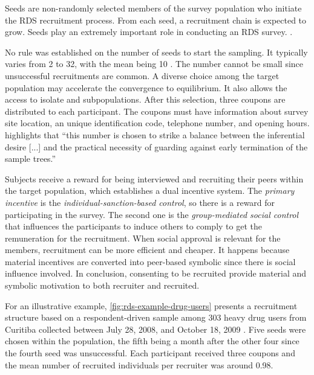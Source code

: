 \begin{citacao}
  Seeds are non-randomly selected members of the survey population who initiate the RDS
  recruitment process. From each seed, a recruitment chain is expected to grow. Seeds play
  an extremely important role in conducting an RDS survey. \cite[p. 70]{world2013introduction}.
\end{citacao}

No rule was established on the number of seeds to start the sampling. It
typically varies from 2 to 32, with the mean being 10 \cite[p. 70]{world2013introduction}. The number cannot be
small since unsuccessful recruitments are common. A diverse choice among the
target population may accelerate the convergence to equilibrium. It also
allows the access to isolate and subpopulations. After this selection, three
coupons are distributed to each participant. The coupons must have
information about survey site location, an unique identification code,
telephone number, and opening hours. \textcite[p. 67]{gile2018methods}
highlights that ``this number is chosen to strike a balance between the
inferential desire [...] and the practical necessity of guarding against early
termination of the sample trees.'' 

Subjects receive a reward for being interviewed and recruiting their peers
within the target population, which establishes a dual incentive system. The
{\em primary incentive} is the {\em individual-sanction-based control}, so there is a
reward for participating in the survey. The second one is the {\em
group-mediated social control} that influences the participants to induce
others to comply to get the remuneration for the recruitment. When social
approval is relevant for the members, recruitment can be more efficient and
cheaper. It happens because material incentives are converted into peer-based symbolic since there is
social influence involved. In conclusion, consenting to be recruited provide
material and symbolic motivation to both recruiter and recruited. 

For an illustrative example, \autoref{fig:rds-example-drug-users} presents a recruitment structure
based on a respondent-driven sample among 303 heavy drug users from
Curitiba collected between July 28, 2008, and October 18, 2009  
\cite[Web Appendix]{salganik2011assessing}. Five seeds were chosen within the
population, the fifth being a month after the other four since the fourth seed was
unsuccessful. Each participant received three coupons and the mean number of
recruited individuals per recruiter was around 0.98. 

